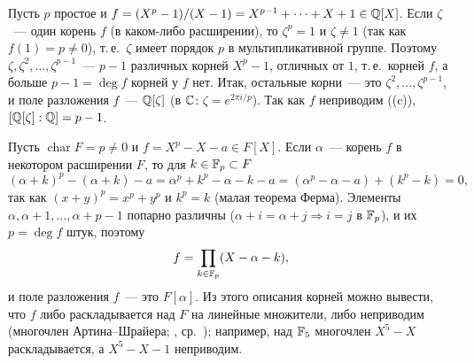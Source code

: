 \begin{example}[2.8]
Пусть $p$ простое и $f=(X^p-1)/(X-1)=X^{p-1}+\dots+X+1\in\mathbb Q[X]$. Если $\zeta$~--- один корень $f$ (в каком-либо
расширении), то $\zeta^p=1$ и $\zeta\ne1$ (так как $f(1)=p\ne0$), т.\,е.\ $\zeta$ имеет порядок $p$ в мультипликативной
группе. Поэтому $\zeta,\zeta^2,\dots,\zeta^{p-1}$~--- $p-1$ различных корней $X^p-1$, отличных от $1$, т.\,е.\ корней $f$, а
больше $p-1=\deg f$ корней у $f$ нет. Итак, остальные корни~--- это $\zeta^2,\dots,\zeta^{p-1}$, и поле разложения $f$~---
$\mathbb Q[\zeta]$ (в $\mathbb C$: $\zeta=e^{2\pi i/p}$). Так как $f$ неприводим ((c)), $[\mathbb Q[\zeta]:\mathbb Q]=p-1$.
\end{example}

\begin{example}[2.9]
Пусть $\operatorname{char}F=p\ne0$ и $f=X^p-X-a\in F[X]$. Если $\alpha$~--- корень $f$ в некотором расширении $F$, то для
$k\in\mathbb F_p\subset F$
\[
(\alpha+k)^p-(\alpha+k)-a=\alpha^p+k^p-\alpha-k-a=(\alpha^p-\alpha-a)+(k^p-k)=0,
\]
так как $(x+y)^p=x^p+y^p$ и $k^p=k$ (малая теорема Ферма). Элементы $\alpha,\alpha+1,\dots,\alpha+p-1$ попарно различны
($\alpha+i=\alpha+j\Rightarrow i=j$ в $\mathbb F_p$), и их $p=\deg f$ штук, поэтому
\[
f=\prod_{k\in\mathbb F_p}(X-\alpha-k),
\]
и поле разложения $f$~--- это $F[\alpha]$. Из этого описания корней можно вывести, что $f$ либо раскладывается над $F$
на линейные множители, либо неприводим (многочлен Артина--Шрайера; , ср.\ );
например, над $\mathbb F_5$ многочлен $X^5-X$ раскладывается, а $X^5-X-1$ неприводим.
\end{example}

